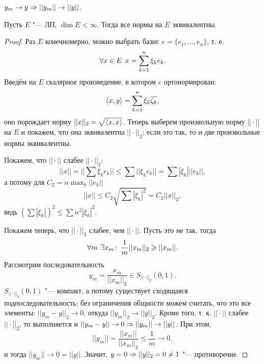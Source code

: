 \documentclass[main]{subfiles}
\begin{document}
\begin{exercise}
  \( y_m \to y \Rightarrow ||y_m|| \to ||y|| \).
\end{exercise}

\begin{proposition}
  Пусть \( E \) "--- ЛП, \( \dim E < \infty \). Тогда все нормы на
  \( E \) эквивалентны.
\end{proposition}
\begin{proof}
  Раз \( E \) конечномерно, можно выбрать базис
  \( e = \{ e_1, \dots, e_n \} \), т. е.
  \[ \forall {x \in E} \; \, x = \sum_{k = 1}^n \xi_k e_k. \]
  Введём на \( E \) скалярное произведение, в котором
  \( e \) ортонормирован:
  \[ \langle x, y \rangle = \sum_{k = 1}^n \xi_k \overline{\zeta_k}, \]
  оно порождает норму \( ||x||_2 = \sqrt{\langle x, x \rangle} \).
  Теперь выберем произвольную норму \( ||\cdot|| \) на \( E \)
  и покажем, что она эквивалентна \( ||\cdot||_2 \);
  если это так, то и две произвольные нормы эквивалентны.

  Покажем, что \( ||\cdot|| \) слабее \( ||\cdot||_2 \):
  \[
    ||x|| = ||\sum \xi_k e_k|| \le
    \sum ||\xi_k e_k|| = \sum |\xi_k| ||e_k||,
  \]
  а потому для \( C_2 = n \max_k ||e_k|| \)
  \[
    ||x|| \le C_2 \sqrt{\sum |\xi_k|^2} = C_2 ||x||_2,
  \]
  ведь \( {\left( \sum |\xi_k| \right)}^2 \le \sum n^2 |\xi_k|^2 \).

  Покажем теперь, что \( ||\cdot||_2 \) слабее, чем \( ||\cdot|| \).
  Пусть это не так, тогда
  \[
    \forall {m} \; \, \exists x_m \colon \: \frac{1}{m} ||x_m||_2 \geqslant ||x_m||.
  \]
  Рассмотрим последовательность 
  \[ y_m = \frac{x_m}{||x_m||_2} \in S_{||\cdot||_2}(0, 1). \]
  \( S_{||\cdot||_2}(0, 1) \) "--- компакт,
  а потому существует сходящаяся подпоследовательность;
  без ограничения общности можем считать,
  что это все элементы: \( ||y_m - y||_2 \to 0 \),
  откуда \( ||y_m||_2 \to ||y||_2 \).
  Кроме того,
  т. к. \( ||\cdot|| \) слабее \( ||\cdot||_2 \),
  то выполняется и \( ||y_m - y|| \to 0 \Rightarrow ||y_m|| \to ||y|| \).
  При этом,
  \[ ||y_m|| = \frac{||x_m||}{||x_m||_2} \le \frac{1}{m} \to 0, \]
  и тогда \( ||y_m|| \to 0 = ||y|| \).
  Значит, \( y = 0 \Rightarrow ||y||_2 = 0 \ne 1 \) "---
  противоречие.
\end{proof}
\end{document}

